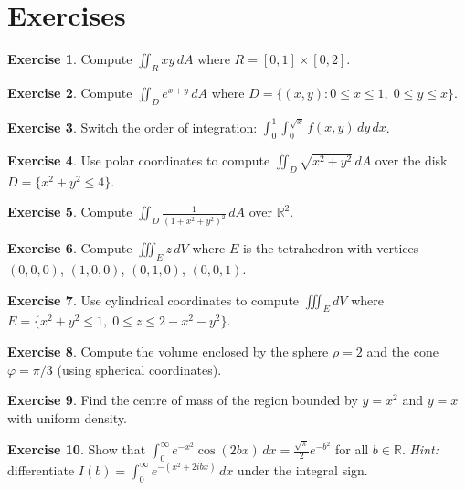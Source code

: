 \documentclass[12pt,a4paper]{book}
\theoremstyle{definition}
\newtheorem{exercise}{Exercise}[chapter]
\begin{document}
\section{Exercises}
\label{sec:ex-ch10}

\begin{exercise}
Compute $\iint_R xy\,dA$ where $R=[0,1]\times[0,2]$.
\end{exercise}

\begin{exercise}
Compute $\iint_D e^{x+y}\,dA$ where
$D=\{(x,y):0\le x\le 1,\;0\le y\le x\}$.
\end{exercise}

\begin{exercise}
Switch the order of integration:
$\int_0^1\int_0^{\sqrt{x}}f(x,y)\,dy\,dx$.
\end{exercise}

\begin{exercise}
Use polar coordinates to compute $\iint_D\sqrt{x^2+y^2}\,dA$ over the disk
$D=\{x^2+y^2\le 4\}$.
\end{exercise}

\begin{exercise}
Compute $\iint_D \frac{1}{(1+x^2+y^2)^2}\,dA$ over $\mathbb{R}^2$.
\end{exercise}

\begin{exercise}
Compute $\iiint_E z\,dV$ where $E$ is the tetrahedron with vertices
$(0,0,0)$, $(1,0,0)$, $(0,1,0)$, $(0,0,1)$.
\end{exercise}

\begin{exercise}
Use cylindrical coordinates to compute $\iiint_E dV$ where
$E=\{x^2+y^2\le 1,\;0\le z\le 2-x^2-y^2\}$.
\end{exercise}

\begin{exercise}
Compute the volume enclosed by the sphere $\rho=2$ and the cone
$\varphi=\pi/3$ (using spherical coordinates).
\end{exercise}

\begin{exercise}
Find the centre of mass of the region bounded by $y=x^2$ and $y=x$
with uniform density.
\end{exercise}

\begin{exercise}
Show that $\int_0^{\infty}e^{-x^2}\cos(2bx)\,dx=\frac{\sqrt{\pi}}{2}e^{-b^2}$
for all $b\in\mathbb{R}$.
\textit{Hint:} differentiate $I(b)=\int_0^{\infty}e^{-(x^2+2ibx)}\,dx$
under the integral sign.
\end{exercise}
\end{document}
